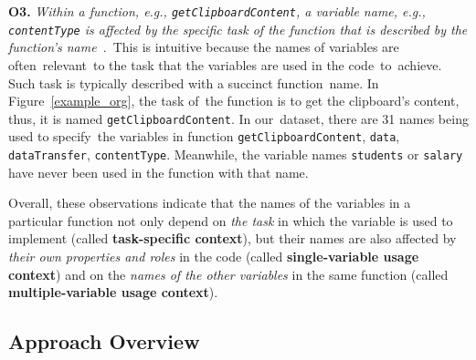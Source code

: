 %
%

\textbf{O3.} \textit{Within a function, e.g.,
  \texttt{getClipboardContent}, a variable name, e.g.,
  \texttt{contentType} is affected by the specific task of the
  function that is described by the function's
  name~\cite{sutton-fse15}}.~This is intuitive because the names of
variables are often~relevant~to the task that the variables are used
in the code~to~achieve. Such task is typically described with a
succinct function~name.
In Figure~\ref{example_org}, the task of~the function is to get the
clipboard's content, thus, it is named
\texttt{get\-ClipboardContent}. In our~dataset, there are 31
names being used to specify~the variables in function
\texttt{getClipboardContent}, \eg \texttt{data},
\texttt{dataTransfer}, \texttt{contentType}.
Meanwhile, the variable names \texttt{students}
or \texttt{salary} have never been used in the function with that
name.


Overall, these observations indicate that the names of the variables
in a particular function not only depend on {\em the task} in which
the variable is used to implement (called {\bf task-specific context}), but
their names are also affected by {\em their own properties and roles} in the
code (called {\bf single-variable usage context}) and on the {\em names of the
other variables} in the same function (called {\bf multiple-variable usage
  context}).

\subsection{Approach Overview}


